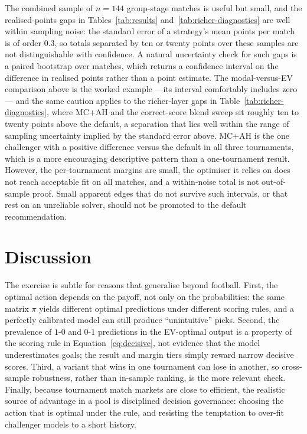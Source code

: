 \documentclass[11pt]{article}
\begin{document}
The combined sample of \(n=144\) group-stage matches is useful but small, and the realised-points gaps in Tables~\ref{tab:results} and~\ref{tab:richer-diagnostics} are well within sampling noise: the standard error of a strategy's mean points per match is of order $0.3$, so totals separated by ten or twenty points over these samples are not distinguishable with confidence. A natural uncertainty check for such gaps is a paired bootstrap over matches, which returns a confidence interval on the difference in realised points rather than a point estimate. The modal-versus-EV comparison above is the worked example ---its interval comfortably includes zero --- and the same caution applies to the richer-layer gaps in Table~\ref{tab:richer-diagnostics}, where MC+AH and the correct-score blend sweep sit roughly ten to twenty points above the default, a separation that lies well within the range of sampling uncertainty implied by the standard error above. MC+AH is the one challenger with a positive difference versus the default in all three tournaments, which is a more encouraging descriptive pattern than a one-tournament result. However, the per-tournament margins are small, the optimiser it relies on does not reach acceptable fit on all matches, and a within-noise total is not out-of-sample proof. Small apparent edges that do not survive such intervals, or that rest on an unreliable solver, should not be promoted to the default recommendation.

\section{Discussion}

The exercise is subtle for reasons that generalise beyond football. First, the optimal action
depends on the payoff, not only on the probabilities: the same matrix $\pi$ yields different
optimal predictions under different scoring rules, and a perfectly calibrated model can still
produce ``unintuitive'' picks. Second, the prevalence of $1\text{-}0$ and $0\text{-}1$
predictions in the EV-optimal output is a property of the scoring rule
in Equation~\eqref{eq:decisive}, not evidence that the model underestimates goals; the result
and margin tiers simply reward narrow decisive scores. Third, a variant that wins in one
tournament can lose in another, so cross-sample robustness, rather than in-sample ranking, is the more relevant check. Finally, because tournament match markets are close to efficient, the realistic
source of advantage in a pool is disciplined decision governance: choosing the action that
is optimal under the rule, and resisting the temptation to over-fit challenger models to a
short history.
\end{document}

